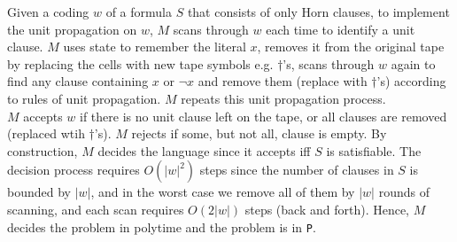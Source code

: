 \documentclass[12pt]{article}
\newcommand{\code}{\texttt}
\begin{document}
Given a coding \(w\) of a formula \(S\) that consists of only Horn clauses, to implement the unit propagation on \(w\), \(M\) scans through \(w\) each time to identify a unit clause. \(M\) uses state to remember the literal \(x\), removes it from the original tape by replacing the cells with new tape symbols e.g. \(\dagger\)'s, scans through \(w\) again to find any clause containing \(x\) or \(\neg x\) and remove them (replace with \(\dagger\)'s) according to rules of unit propagation. \(M\) repeats this unit propagation process. 
\\
\(M\) accepts \(w\) if there is no unit clause left on the tape, or all clauses are removed (replaced wtih \(\dagger\)'s). \(M\) rejects if some, but not all, clause is empty. By construction, \(M\) decides the language since it accepts iff \(S\) is satisfiable.
The decision process requires \(O(|w|^2)\) steps since the number of clauses in \(S\) is bounded by \(|w|\), and in the worst case we remove all of them by \(|w|\) rounds of scanning, and each scan requires \(O(2|w|)\) steps (back and forth). Hence, \(M\) decides the problem in polytime and the problem is in \code{P}.

\pagebreak
\end{document}
